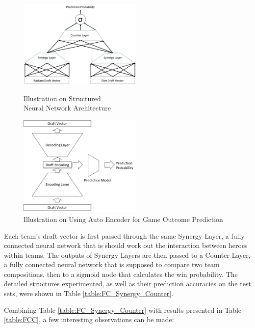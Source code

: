 \documentclass{article}
\begin{document}

\begin{figure}[htb]
\begin{minipage}[t]{0.5\linewidth}
\includegraphics[width=2.4in]{Picture1.png}
\caption{Illustration on Structured \\ Neural Network Architecture}
\label{image:pic1}
\end{minipage}%
\begin{minipage}[t]{0.5\linewidth}
\includegraphics[width=2.4in]{Picture2.png}
\caption{Illustration on Using Auto Encoder for Game Outcome Prediction}
\label{image:pic2}
\end{minipage}
\end{figure}


Each team’s draft vector is first passed through the same Synergy Layer, a fully connected neural network that is should work out the interaction between heroes within teams. The outputs of Synergy Layers are then passed to a Counter Layer, a fully connected neural network that is supposed to compare two team compositions, then to a sigmoid node that calculates the win probability. The detailed structures experimented, as well as their prediction accuracies on the test sets, were shown in Table \ref{table:FC_Synergy_Counter}.

Combining Table \ref{table:FC_Synergy_Counter} with results presented in Table \ref{table:FCC}, a few interesting observations can be made:
\end{document}
